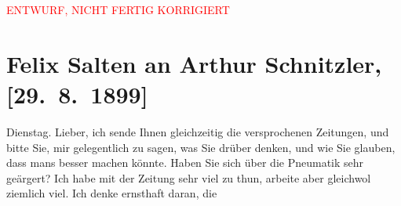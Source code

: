 
\begin{center}
            \textcolor{red}{ENTWURF, NICHT FERTIG KORRIGIERT}
                      \end{center}
            
         
         \renewcommand{\erwaehntePersonen}{Personen: Hugo von Hofmannsthal}
         \renewcommand{\erwaehnteInstitutionen}{Institutionen: Wiener Allgemeine Zeitung, Wiener Verlag}
         \renewcommand{\erwaehnteOrte}{Orte: Wien}
         \renewcommand{\erwaehnteWerke}{Werke: Begräbnis, Das Manhard-Zimmer, Der Hinterbliebene, Der Hinterbliebene. Kurze Novellen, Fernen, Flucht, Heldentod. Novelle, Lebenszeit, Sedan}
               \section[Felix Salten an Arthur Schnitzler, {[}29. 8. 1899{]}]{ Felix Salten an Arthur Schnitzler, {[}29. 8. 1899{]}}\nopagebreak{}\rehead{ }\begin{ledgroupsized}[t]{13cm}\normalsize\beginnumbering \toendnotes[C]{\smallbreak\pagebreak[2]} 
\toendnotes[C]{\smallbreak}\pstart
           \raggedleft{}{\pb}Dienstag. \pend
           \pstart
           Lieber, ich sende Ihnen gleichzeitig die versprochenen Zeitungen,
               und bitte Sie, mir gelegentlich zu sagen, was Sie drüber denken, und wie Sie glauben,
               dass mans besser machen könnte. Haben Sie sich über die Pneumatik sehr geärgert? Ich
               habe mit der Zeitung sehr viel
               zu thun, arbeite aber gleichwol ziemlich viel. Ich denke ernsthaft daran, die
               \label{K_L03299-1v}
\end{ledgroupsized}

